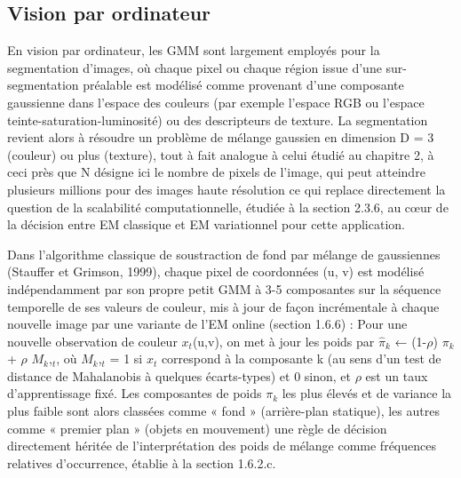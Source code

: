 \subsection{Vision par ordinateur}
En vision par ordinateur, les GMM sont largement employés pour la segmentation d'images, où chaque pixel  ou chaque région issue d'une sur-segmentation préalable  est modélisé comme provenant d'une composante gaussienne dans l'espace des couleurs (par exemple l'espace RGB ou l'espace teinte-saturation-luminosité) ou des descripteurs de texture. La segmentation revient alors à résoudre un problème de mélange gaussien en dimension D = 3 (couleur) ou plus (texture), tout à fait analogue à celui étudié au chapitre 2, à ceci près que N désigne ici le nombre de pixels de l'image, qui peut atteindre plusieurs millions pour des images haute résolution  ce qui replace directement la question de la scalabilité computationnelle, étudiée à la section 2.3.6, au cœur de la décision entre EM classique et EM variationnel pour cette application.

Dans l'algorithme classique de soustraction de fond par mélange de gaussiennes (Stauffer et Grimson, 1999), chaque pixel de coordonnées (u, v) est modélisé indépendamment par son propre petit GMM à 3-5 composantes sur la séquence temporelle de ses valeurs de couleur, mis à jour de façon incrémentale à chaque nouvelle image par une variante de l'EM online (section 1.6.6) : Pour une nouvelle observation de couleur $x_{t}$(u,v), on met à jour les poids par $\hat{\pi }$$_{k}$ ← (1-$\rho $) $\pi _{k}$ + $\rho $ $M_{k}$,$_{t}$, où $M_{k}$,$_{t}$ = 1 si $x_{t}$ correspond à la composante k (au sens d'un test de distance de Mahalanobis à quelques écarts-types) et 0 sinon, et $\rho $ est un taux d'apprentissage fixé. Les composantes de poids $\pi _{k}$ les plus élevés et de variance la plus faible sont alors classées comme « fond » (arrière-plan statique), les autres comme « premier plan » (objets en mouvement)  une règle de décision directement héritée de l'interprétation des poids de mélange comme fréquences relatives d'occurrence, établie à la section 1.6.2.c.

